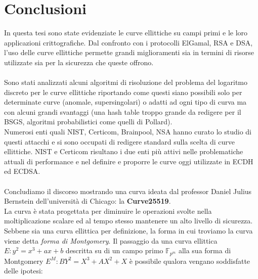 \documentclass[a4paper,12pt]{tesiinfo}
\newcommand\ddfrac[2]{\frac{\displaystyle #1}{\displaystyle #2}}
\begin{document}
\chapter{Conclusioni}
In questa tesi sono state evidenziate le curve ellittiche su campi primi e le loro applicazioni crittografiche. Dal confronto con i protocolli ElGamal, RSA e DSA, l'uso delle curve ellittiche permette grandi miglioramenti sia in termini di risorse utilizzate sia per la sicurezza che queste offrono.
\\
\\
Sono stati analizzati alcuni algoritmi di risoluzione del problema del logaritmo discreto per le curve ellittiche riportando come questi siano possibili solo per determinate curve (anomale, supersingolari) o adatti ad ogni tipo di curva ma con alcuni grandi svantaggi (una hash table troppo grande da redigere per il BSGS, algoritmi probabilistici come quelli di Pollard).
\\
Numerosi enti quali NIST, Certicom, Brainpool, NSA hanno curato lo studio di questi attacchi e si sono occupati di redigere standard sulla scelta di curve ellittiche. NIST e Certicom risultano i due enti pi\`u attivi nelle problematiche attuali di performance e nel definire e proporre le curve oggi utilizzate in ECDH ed ECDSA. 
\\
\\
Concludiamo il discorso mostrando una curva ideata dal professor Daniel Julius Bernstein dell'universit\`a di Chicago: la \textbf{Curve25519}. 
\\
La curva \`e stata progettata per diminuire le operazioni svolte nella moltiplicazione scalare ed al tempo stesso mantenere un alto livello di sicurezza. Sebbene sia una curva ellittica per definizione, la forma in cui troviamo la curva viene detta \textit{forma di Montgomery}. Il passaggio \cite{ec2mont} da una curva ellittica $E:y^2=x^3+ax+b$ descritta su di un campo primo $\mathbb{F}_{p^m}$ alla sua forma di Montgomery $E^M: BY^2 =X^3+AX^2+X$ \`e possibile qualora vengano soddisfatte delle ipotesi: 
\end{document}
